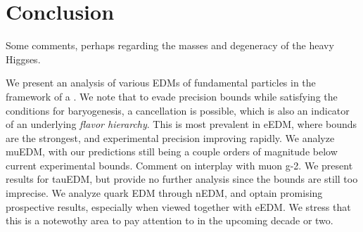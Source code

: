 \chapter{Conclusion}
\label{ch:conclusion}

Some comments, perhaps regarding the masses and degeneracy of the heavy Higgses.

We present an analysis of various EDMs of fundamental particles in the framework of a {\gthdm}.
We note that to evade precision bounds while satisfying the conditions for baryogenesis, a cancellation is possible,
which is also an indicator of an underlying \textit{flavor hierarchy}.
This is most prevalent in eEDM, where bounds are the strongest, and experimental precision improving rapidly.
We analyze muEDM, with our predictions still being a couple orders of magnitude below current experimental bounds.
Comment on interplay with muon g-2.
We present results for tauEDM, but provide no further analysis since the bounds are still too imprecise.
We analyze quark EDM through nEDM, and optain promising prospective results, especially when viewed together with eEDM.
We stress that this is a notewothy area to pay attention to in the upcoming decade or two.